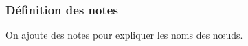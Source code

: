 \documentclass[a4paper,11pt]{report}
\newcommand{\inputTikZ}[1]{%
  }%
\newcommand{\inputTikZ}[1]{%
    \texttt{[image: fig/\#1.pdf]}%
  }%
\begin{document}
\subsubsection{Définition des notes}

On ajoute des notes pour expliquer les noms des n\oe{}uds.

\medskip

\vspace{-0.4cm}
{\color{red!70!black}}

\begin{center}
\inputTikZ{compdiagexstep4}
\end{center}

\end{document}
